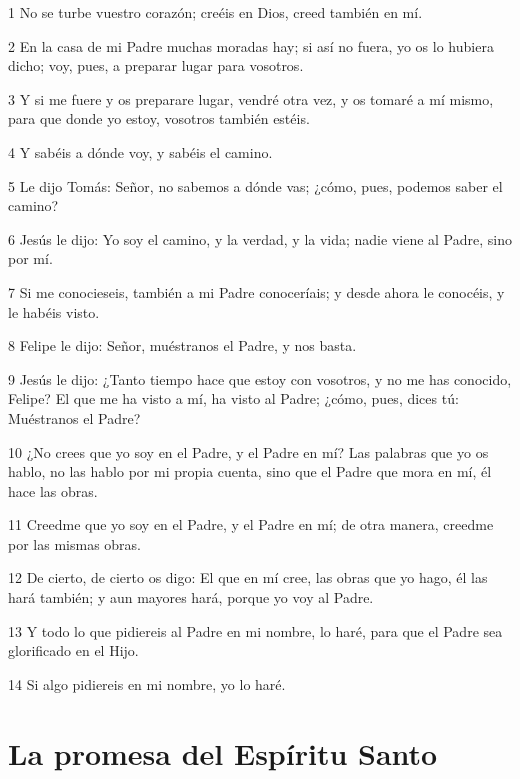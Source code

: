 \par 1 No se turbe vuestro corazón; creéis en Dios, creed también en mí.
\par 2 En la casa de mi Padre muchas moradas hay; si así no fuera, yo os lo hubiera dicho; voy, pues, a preparar lugar para vosotros.
\par 3 Y si me fuere y os preparare lugar, vendré otra vez, y os tomaré a mí mismo, para que donde yo estoy, vosotros también estéis.
\par 4 Y sabéis a dónde voy, y sabéis el camino.
\par 5 Le dijo Tomás: Señor, no sabemos a dónde vas; ¿cómo, pues, podemos saber el camino?
\par 6 Jesús le dijo: Yo soy el camino, y la verdad, y la vida; nadie viene al Padre, sino por mí.
\par 7 Si me conocieseis, también a mi Padre conoceríais; y desde ahora le conocéis, y le habéis visto.
\par 8 Felipe le dijo: Señor, muéstranos el Padre, y nos basta.
\par 9 Jesús le dijo: ¿Tanto tiempo hace que estoy con vosotros, y no me has conocido, Felipe? El que me ha visto a mí, ha visto al Padre; ¿cómo, pues, dices tú: Muéstranos el Padre?
\par 10 ¿No crees que yo soy en el Padre, y el Padre en mí? Las palabras que yo os hablo, no las hablo por mi propia cuenta, sino que el Padre que mora en mí, él hace las obras.
\par 11 Creedme que yo soy en el Padre, y el Padre en mí; de otra manera, creedme por las mismas obras.
\par 12 De cierto, de cierto os digo: El que en mí cree, las obras que yo hago, él las hará también; y aun mayores hará, porque yo voy al Padre.
\par 13 Y todo lo que pidiereis al Padre en mi nombre, lo haré, para que el Padre sea glorificado en el Hijo.
\par 14 Si algo pidiereis en mi nombre, yo lo haré.

\section*{La promesa del Espíritu Santo}

